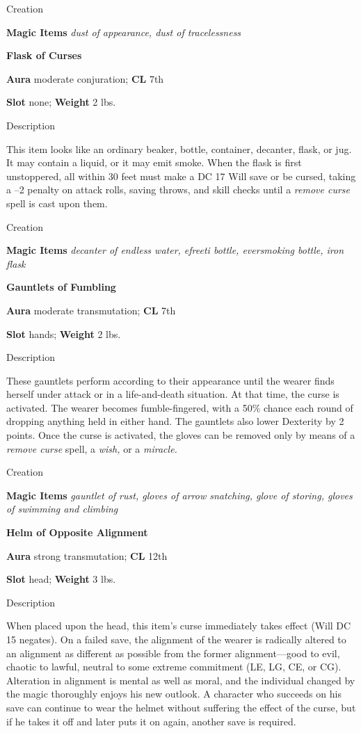 Creation
				
\textbf{Magic Items}\textit{ dust of appearance, dust of tracelessness}
				
\textbf{Flask of Curses}
				
\textbf{Aura} moderate conjuration; \textbf{CL} 7th
				
\textbf{Slot} none; \textbf{Weight }2 lbs.
				
Description
				
This item looks like an ordinary beaker, bottle, container, decanter, flask, or jug. It may contain a liquid, or it may emit smoke. When the flask is first unstoppered, all within 30 feet must make a DC 17 Will save or be cursed, taking a --2 penalty on attack rolls, saving throws, and skill checks until a \textit{remove curse }spell is cast upon them. 
				
Creation
				
\textbf{Magic Items}\textit{ decanter of endless water, efreeti bottle, eversmoking bottle, iron flask}
				
\textbf{Gauntlets of Fumbling}
				
\textbf{Aura} moderate transmutation; \textbf{CL} 7th
				
\textbf{Slot} hands; \textbf{Weight }2 lbs.
				
Description
				
These gauntlets perform according to their appearance until the wearer finds herself under attack or in a life-and-death situation. At that time, the curse is activated. The wearer becomes fumble-fingered, with a 50\% chance each round of dropping anything held in either hand. The gauntlets also lower Dexterity by 2 points. Once the curse is activated, the gloves can be removed only by means of a \textit{remove curse }spell, a \textit{wish, }or a \textit{miracle.} 
				
Creation
				
\textbf{Magic Items}\textit{ gauntlet of rust, gloves of arrow snatching, glove of storing, gloves of swimming and climbing}
				
\textbf{Helm of Opposite Alignment}
				
\textbf{Aura} strong transmutation; \textbf{CL} 12th
				
\textbf{Slot} head; \textbf{Weight} 3 lbs.
				
Description
				
When placed upon the head, this item's curse immediately takes effect (Will DC 15 negates). On a failed save, the alignment of the wearer is radically altered to an alignment as different as possible from the former alignment---good to evil, chaotic to lawful, neutral to some extreme commitment (LE, LG, CE, or CG). Alteration in alignment is mental as well as moral, and the individual changed by the magic thoroughly enjoys his new outlook. A character who succeeds on his save can continue to wear the helmet without suffering the effect of the curse, but if he takes it off and later puts it on again, another save is required. 
				

